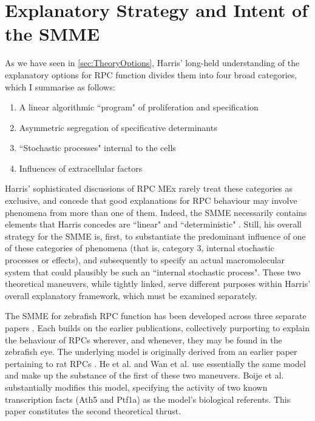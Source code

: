 \section{Explanatory Strategy and Intent of the SMME}
\label{sec:SMMEexplanatorystrat}
As we have seen in \autoref{sec:TheoryOptions}, Harris' long-held understanding of the explanatory options for RPC function divides them into four broad categories, which I summarise as follows:

\begin{enumerate}
\item A linear algorithmic ``program" of proliferation and specification
\item Asymmetric segregation of specificative determinants
\item ``Stochastic processes" internal to the cells
\item Influences of extracellular factors
\end{enumerate}

Harris' sophisticated discussions of RPC MEx rarely treat these categories as exclusive, and concede that good explanations for RPC behaviour may involve phenomena from more than one of them. Indeed, the SMME necessarily contains elements that Harris concedes are ``linear" and ``deterministic" \cite{He2012}. Still, his overall strategy for the SMME is, first, to substantiate the predominant influence of one of these categories of phenomena (that is, category 3, internal stochastic processes or effects), and subsequently to specify an actual macromolecular system that could plausibly be such an ``internal stochastic process". These two theoretical maneuvers, while tightly linked, serve different purposes within Harris' overall explanatory framework, which must be examined separately.

The SMME for zebrafish RPC function has been developed across three separate papers \cite{He2012,Boije2015,Wan2016}. Each builds on the earlier publications, collectively purporting to explain the behaviour of RPCs wherever, and whenever, they may be found in the zebrafish eye. The underlying model is originally derived from an earlier paper pertaining to rat RPCs \cite{Gomes2011}. He et al. \cite{He2012} and Wan et al. \cite{Wan2016} use essentially the same model and make up the substance of the first of these two maneuvers. Boije et al. \cite{Boije2015} substantially modifies this model, specifying the activity of two known transcription facts (Ath5 and Ptf1a) as the model's biological referents. This paper constitutes the second theoretical thrust.

